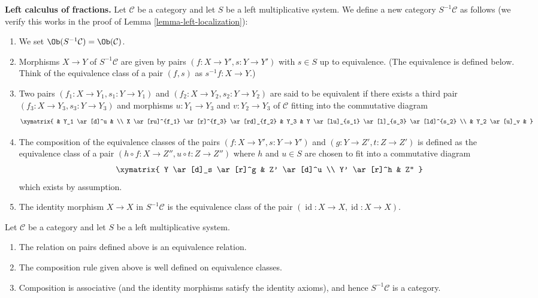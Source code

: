 \medskip\noindent
{\bf Left calculus of fractions.}
Let $\mathcal{C}$ be a category and let $S$ be a left multiplicative
system. We define a new category $S^{-1}\mathcal{C}$ as follows
(we verify this works in the proof of
Lemma \ref{lemma-left-localization}):
\begin{enumerate}
\item We set $\Ob(S^{-1}\mathcal{C}) = \Ob(\mathcal{C})$.
\item Morphisms $X \to Y$ of $S^{-1}\mathcal{C}$ are given by pairs
$(f : X \to Y', s : Y \to Y')$ with $s \in S$ up to equivalence.
(The equivalence is defined below. Think of the equivalence class
of a pair $(f, s)$ as $s^{-1}f : X \to Y$.)
\item Two pairs $(f_1 : X \to Y_1, s_1 : Y \to Y_1)$ and
$(f_2 : X \to Y_2, s_2 : Y \to Y_2)$ are said to be equivalent
if there exists a third pair $(f_3 : X \to Y_3, s_3 : Y \to Y_3)$
and morphisms $u : Y_1 \to Y_3$ and $v : Y_2 \to Y_3$ of $\mathcal{C}$
fitting into the commutative diagram
$$
\xymatrix{
 & Y_1 \ar[d]^u & \\
X \ar[ru]^{f_1} \ar[r]^{f_3} \ar[rd]_{f_2} &
Y_3 &
Y \ar[lu]_{s_1} \ar[l]_{s_3} \ar[ld]^{s_2} \\
& Y_2 \ar[u]_v &
}
$$
\item The composition of the equivalence classes of the pairs
$(f : X \to Y', s : Y \to Y')$ and $(g : Y \to Z', t : Z \to Z')$
is defined as the equivalence class of a pair
$(h \circ f : X \to Z'', u \circ t : Z \to Z'')$
where $h$ and $u \in S$ are chosen to fit into a commutative diagram
$$
\xymatrix{
Y \ar[d]_s \ar[r]^g & Z' \ar[d]^u \\
Y' \ar[r]^h & Z''
}
$$
which exists by assumption.
\item The identity morphism $X \to X$ in $S^{-1} \mathcal{C}$ is the
equivalence class of the pair $(\operatorname{id} : X \to X,
\operatorname{id} : X \to X)$.
\end{enumerate}

\begin{lemma}
\label{lemma-left-localization}
Let $\mathcal{C}$ be a category and let $S$ be a left multiplicative
system.
\begin{enumerate}
\item The relation on pairs defined above is an equivalence relation.
\item The composition rule given above is well defined on equivalence
classes.
\item Composition is associative (and the identity morphisms satisfy
the identity axioms), and hence $S^{-1}\mathcal{C}$ is a category.
\end{enumerate}
\end{lemma}

